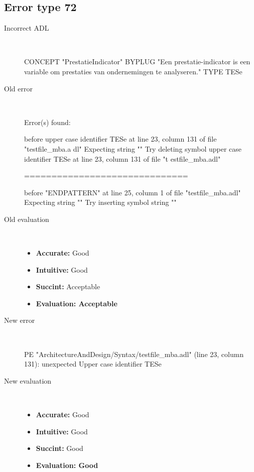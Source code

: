 \subsection{Error type 72}
  \begin{description}
  \item[Incorrect ADL]~\\
\begin{adl}
CONCEPT "PrestatieIndicator" BYPLUG "Een prestatie-indicator is een variable om prestaties van ondernemingen te analyseren." TYPE TESe\end{adl}
  \item[Old error]~\\
\begin{haskell}
Error(s) found:

before upper case identifier TESe at line 23, column 131 of file "testfile_mba.a
dl"
Expecting string ""
Try deleting symbol upper case identifier TESe at line 23, column 131 of file "t
estfile_mba.adl"

==============================

before "ENDPATTERN" at line 25, column 1 of file "testfile_mba.adl"
Expecting string ""
Try inserting symbol string ""
\end{haskell}
  \item[Old evaluation]~\\
    \begin{itemize}
    \item \textbf{Accurate:} Good
    \item \textbf{Intuitive:} Good
    \item \textbf{Succint:} Acceptable
    \item \textbf{Evaluation: Acceptable}
    \end{itemize}
  \item[New error]~\\
\begin{haskell}
PE "ArchitectureAndDesign/Syntax/testfile_mba.adl" (line 23, column 131):
unexpected Upper case identifier TESe\end{haskell}
  \item[New evaluation]~\\
    \begin{itemize}
    \item \textbf{Accurate:} Good
    \item \textbf{Intuitive:} Good
    \item \textbf{Succint:} Good
    \item \textbf{Evaluation: Good
}
    \end{itemize}
  \end{description}

